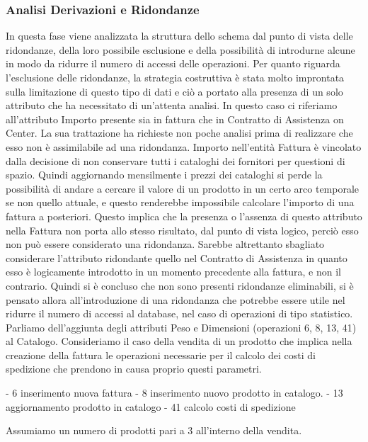 
\subsubsection{Analisi Derivazioni e Ridondanze}
In questa fase viene analizzata la struttura dello schema dal punto di vista delle ridondanze, della loro possibile esclusione e della possibilità di introdurne alcune in modo da ridurre il numero di accessi delle operazioni. \newline 
Per quanto riguarda l'esclusione delle ridondanze, la strategia costruttiva è stata molto improntata sulla limitazione di questo tipo di dati e ciò a portato alla presenza di un solo attributo che ha necessitato di un'attenta analisi. In questo caso ci riferiamo all'attributo Importo presente sia in fattura che in Contratto di Assistenza on Center. La sua trattazione ha richieste non poche analisi prima di realizzare che esso non è assimilabile ad una ridondanza. Importo nell'entità Fattura è vincolato dalla decisione di non conservare tutti i cataloghi dei fornitori per questioni di spazio. Quindi aggiornando mensilmente i prezzi dei cataloghi si perde la possibilità di andare a cercare il valore di un prodotto in un certo arco temporale se non quello attuale, e questo renderebbe impossibile calcolare l'importo di una fattura a posteriori.\newline
Questo implica che la presenza o l'assenza di questo attributo nella Fattura non porta allo stesso risultato, dal punto di vista logico, perciò esso non può essere considerato una ridondanza. Sarebbe altrettanto sbagliato considerare l'attributo ridondante quello nel Contratto di Assistenza in quanto esso è logicamente introdotto in un momento precedente alla fattura, e non il contrario.\newline
Quindi si è concluso che non sono presenti ridondanze eliminabili, si è pensato allora all'introduzione di una ridondanza che potrebbe essere utile nel ridurre il numero di accessi al database, nel caso di operazioni di tipo statistico. Parliamo dell'aggiunta degli attributi Peso e Dimensioni (operazioni 6, 8, 13, 41) al Catalogo.
Consideriamo il caso della vendita di un prodotto che implica nella creazione della fattura le operazioni necessarie per il calcolo dei costi di spedizione che prendono in causa proprio questi parametri.

- 6 inserimento nuova fattura
- 8 inserimento nuovo prodotto in catalogo.
- 13 aggiornamento prodotto in catalogo
- 41 calcolo costi di spedizione

Assumiamo un numero di prodotti pari a 3 all'interno della vendita.


